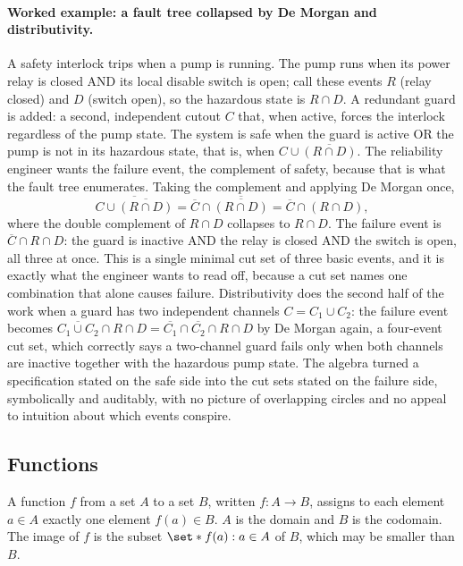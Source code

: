 \paragraph{Worked example: a fault tree collapsed by De Morgan and
distributivity.} A safety interlock trips when a pump is running. The
pump runs when its power relay is closed AND its local disable switch is
open; call these events $R$ (relay closed) and $D$ (switch open), so the
hazardous state is $R \cap D$. A redundant guard is added: a second,
independent cutout $C$ that, when active, forces the interlock regardless
of the pump state. The system is safe when the guard is active OR the
pump is not in its hazardous state, that is, when $C \cup
\overline{(R \cap D)}$. The reliability engineer wants the failure event,
the complement of safety, because that is what the fault tree enumerates.
Taking the complement and applying De Morgan once,
\[
\overline{C \cup \overline{(R \cap D)}}
= \overline{C} \cap \overline{\overline{(R \cap D)}}
= \overline{C} \cap (R \cap D),
\]
where the double complement of $R \cap D$ collapses to $R \cap D$. The
failure event is $\overline{C} \cap R \cap D$: the guard is inactive AND
the relay is closed AND the switch is open, all three at once. This is a
single minimal cut set of three basic events, and it is exactly what the
engineer wants to read off, because a cut set names one combination that
alone causes failure. Distributivity does the second half of the work
when a guard has two independent channels $C = C_{1} \cup C_{2}$: the
failure event becomes $\overline{C_{1} \cup C_{2}} \cap R \cap D =
\overline{C_{1}} \cap \overline{C_{2}} \cap R \cap D$ by De Morgan again,
a four-event cut set, which correctly says a two-channel guard fails only
when both channels are inactive together with the hazardous pump state.
The algebra turned a specification stated on the safe side into the cut
sets stated on the failure side, symbolically and auditably, with no
picture of overlapping circles and no appeal to intuition about which
events conspire.

\subsection{Functions}

A function $f$ from a set $A$ to a set $B$, written $f : A \to B$,
assigns to each element $a \in A$ exactly one element $f(a) \in B$.
$A$ is the domain and $B$ is the codomain. The image of $f$ is the
subset $\set*{f(a) : a \in A}$ of $B$, which may be smaller than $B$.


